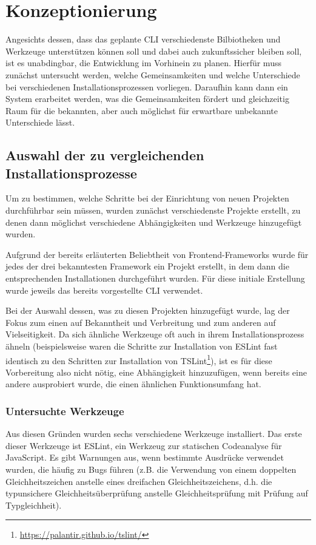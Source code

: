 \section{Konzeptionierung}
\label{komzeptionierung}
Angesichts dessen, dass das geplante \gls{CLI} verschiedenste Bilbiotheken und Werkzeuge unterstützen können soll und dabei auch zukunftssicher bleiben soll, ist es unabdingbar, die Entwicklung im Vorhinein zu planen. Hierfür muss zunächst untersucht werden, welche Gemeinsamkeiten und welche Unterschiede bei verschiedenen Installationsprozessen vorliegen. Daraufhin kann dann ein System erarbeitet werden, was die Gemeinsamkeiten fördert und gleichzeitig Raum für die bekannten, aber auch möglichst für erwartbare unbekannte Unterschiede lässt.

\subsection{Auswahl der zu vergleichenden Installationsprozesse}
Um zu bestimmen, welche Schritte bei der Einrichtung von neuen Projekten durchführbar sein müssen, wurden zunächst verschiedenste Projekte erstellt, zu denen dann möglichst verschiedene Abhängigkeiten und Werkzeuge hinzugefügt wurden.

Aufgrund der bereits erläuterten Beliebtheit von Frontend-Frameworks wurde für jedes der drei bekanntesten Framework ein Projekt erstellt, in dem dann die entsprechenden Installationen durchgeführt wurden. Für diese initiale Erstellung wurde jeweils das bereits vorgestellte \gls{CLI} verwendet.

Bei der Auswahl dessen, was zu diesen Projekten hinzugefügt wurde, lag der Fokus zum einen auf Bekanntheit und Verbreitung und zum anderen auf Vielseitigkeit. Da sich ähnliche Werkzeuge oft auch in ihrem Installationsprozess ähneln (beispielsweise waren die Schritte zur Installation von ESLint fast identisch zu den Schritten zur Installation von TSLint\footnote{\url{https://palantir.github.io/tslint/}}), ist es für diese Vorbereitung also nicht nötig, eine Abhängigkeit hinzuzufügen, wenn bereits eine andere ausprobiert wurde, die einen ähnlichen Funktionsumfang hat.

\subsubsection{Untersuchte Werkzeuge}
Aus diesen Gründen wurden sechs verschiedene Werkzeuge installiert. Das erste dieser Werkzeuge ist ESLint, ein Werkzeug zur statischen Codeanalyse für JavaScript. Es gibt Warnungen aus, wenn bestimmte Ausdrücke verwendet wurden, die häufig zu Bugs führen (z.B. die Verwendung von einem doppelten Gleichheitszeichen anstelle eines dreifachen Gleichheitszeichens, d.h. die typunsichere Gleichheitsüberprüfung anstelle Gleichheitsprüfung mit Prüfung auf Typgleichheit).

